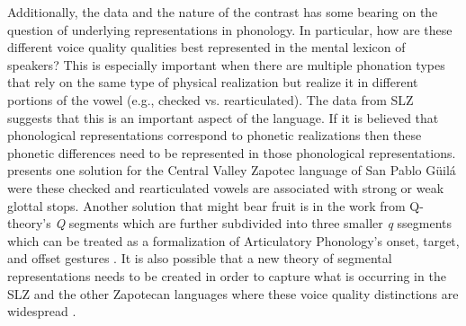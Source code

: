 \documentclass[12pt, letterpaper]{article}
\begin{document}
Additionally, the data and the nature of the contrast has some bearing on the question of underlying representations in phonology. In particular, how are these different voice quality qualities best represented in the mental lexicon of speakers? This is especially important when there are multiple phonation types that rely on the same type of physical realization but realize it in different portions of the vowel (e.g., checked vs. rearticulated). The data from SLZ suggests that this is an important aspect of the language. If it is believed that phonological representations correspond to phonetic realizations then these phonetic differences need to be represented in those phonological representations. \citet{arellanesarellanesSistemaFonologicoPropiedades2009} presents one solution for the Central Valley Zapotec language of San Pablo Güilá were these checked and rearticulated vowels are associated with strong or weak glottal stops. Another solution that might bear fruit is in the work from Q-theory's \textit{Q} segments which are further subdivided into three smaller \textit{q} ssegments \citep{shihAutosegmentalAimsSurfaceOptimizing2019} which can be treated as a formalization of Articulatory Phonology's onset, target, and offset gestures \citep{browmanNotesSyllableStructure1988, browmanArticulatoryGesturesPhonological1989, browmanArticulatoryPhonologyOverview1992}. It is also possible that a new theory of segmental representations needs to be created in order to capture what is occurring in the SLZ and the other Zapotecan languages where these voice quality distinctions are widespread \citep{garciaPhonationTypesTones2018}.


\end{document}
